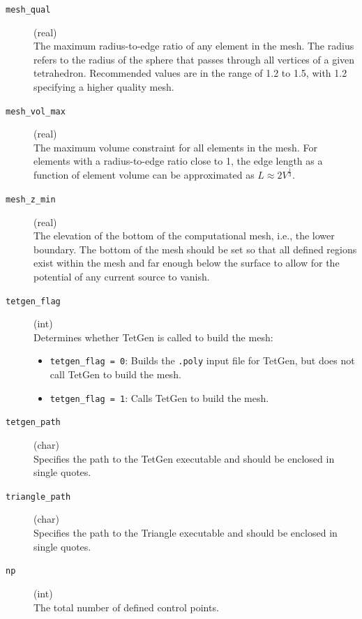 \documentclass[a4paper,12pt]{article}
\begin{document}
\begin{description}
    \item[\texttt{mesh\_qual}] (real)\hfill \\
    The maximum radius-to-edge ratio of any element in the mesh. The radius refers to the radius of the sphere that passes through all vertices of a given tetrahedron. Recommended values are in the range of 1.2 to 1.5, with 1.2 specifying a higher quality mesh.

    \item[\texttt{mesh\_vol\_max}] (real)\hfill \\
    The maximum volume constraint for all elements in the mesh. For elements with a radius-to-edge ratio close to 1, the edge length as a function of element volume can be approximated as $L \approx 2V^\frac{1}{3}$.

    \item[\texttt{mesh\_z\_min}] (real)\hfill \\
    The elevation of the bottom of the computational mesh, i.e., the lower boundary. The bottom of the mesh should be set so that all defined regions exist within the mesh and far enough below the surface to allow for the potential of any current source to vanish.

    \item[\texttt{tetgen\_flag}] (int)\hfill \\
    Determines whether TetGen is called to build the mesh:
    \begin{itemize}
        \item \texttt{tetgen\_flag = 0}: Builds the \texttt{.poly} input file for TetGen, but does not call TetGen to build the mesh.
        \item \texttt{tetgen\_flag = 1}: Calls TetGen to build the mesh.
    \end{itemize}

    \item[\texttt{tetgen\_path}] (char)\hfill \\
    Specifies the path to the TetGen executable and should be enclosed in single quotes.

    \item[\texttt{triangle\_path}] (char)\hfill \\
    Specifies the path to the Triangle executable and should be enclosed in single quotes.

    \item[\texttt{np}] (int)\hfill \\
    The total number of defined control points.


\end{description}
\end{document}

